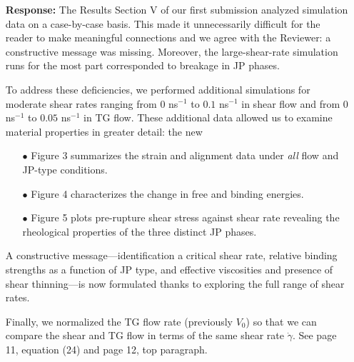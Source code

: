 \documentclass[11pt]{article}
\begin{document}
\begin{itemize}
  \item[] {\bf Response:}
    The Results Section V of our first submission analyzed simulation
    data on a case-by-case basis. This made it unnecessarily difficult
    for the reader to make meaningful connections and we agree with the
    Reviewer: a constructive message was missing. Moreover, the
    large-shear-rate simulation runs for the most part corresponded to
    breakage in JP phases.

    To address these deficiencies, we performed additional simulations
    for moderate shear rates ranging from $0$ ns$^{-1}$ to $0.1$
    ns$^{-1}$ in shear flow and from $0$ ns$^{-1}$ to $0.05$ ns$^{-1}$
    in TG flow. These additional data allowed us to examine material
    properties in greater detail: the new
    \begin{itemize}
      \item[$\bullet$] Figure 3 summarizes the strain and alignment data
        under \emph{all} flow and JP-type conditions.
      \item[$\bullet$] Figure 4 characterizes the change in free and binding energies.
      \item[$\bullet$] Figure 5 plots pre-rupture
        shear stress against shear rate revealing the rheological properties of
        the three distinct JP phases.    
    \end{itemize}
    A constructive message---identification a critical shear rate,
    relative binding strengths as a function of JP type,
    and effective viscosities and presence of shear thinning---is
    now formulated thanks to exploring the full range of
    shear rates.

    Finally, we normalized the TG flow rate (previously $V_0$)
    so that we can compare the shear and TG flow in terms of the same
    shear rate $\dot \gamma$.  See page 11, equation (24) and page 12,
    top paragraph.
\end{itemize}
\end{document}
